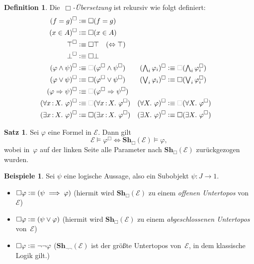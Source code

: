 \documentclass{article}
\theoremstyle{definition}
\newtheorem*{defn}{Definition}
\newtheorem*{satz}{Satz}
\newtheorem*{bspe}{Beispiele}
\theoremstyle{remark}
\newcommand{\defequiv}{\vcentcolon\equiv}
\newcommand{\?}{\,{:}\,}
\renewcommand{\_}{\mathpunct{.}\,}
\newcommand{\Sh}{\mathbf{Sh}} %
\newcommand{\Eat}{\mathcal{E}} %
\begin{document}
\begin{defn}
Die~\emph{$\Box$-Übersetzung} ist rekursiv wie folgt definiert:
\newcommand{\optBox}{\textcolor{lightgray}{\Box}}
\begin{align*}
  (f = g)^\Box &\defequiv \Box(f = g) \\
  (x \in A)^\Box &\defequiv \Box(x \in A) \\
  \top^\Box &\defequiv \Box\top \quad \text{($\Leftrightarrow \top$)} \\
  \bot^\Box &\defequiv \Box\bot \\
  (\varphi \wedge \psi)^\Box &\defequiv \optBox(\varphi^\Box \wedge \psi^\Box) &
  \textstyle (\bigwedge_i \varphi_i)^\Box &\defequiv \textstyle \optBox(\bigwedge_i \varphi_i^\Box) \\
  (\varphi \vee \psi)^\Box &\defequiv \Box(\varphi^\Box \vee \psi^\Box) &
  \textstyle (\bigvee_i \varphi_i)^\Box &\defequiv \textstyle \Box(\bigvee_i \varphi_i^\Box) \\
  (\varphi \Rightarrow \psi)^\Box &\defequiv \optBox(\varphi^\Box \Rightarrow \psi^\Box) \\
  (\forall x\?X\_ \varphi)^\Box &\defequiv \optBox(\forall x\?X\_ \varphi^\Box) &
  (\forall X\_ \varphi)^\Box &\defequiv \optBox(\forall X\_ \varphi^\Box) \\
  (\exists x\?X\_ \varphi)^\Box &\defequiv \Box(\exists x\?X\_ \varphi^\Box) &
  (\exists X\_ \varphi)^\Box &\defequiv \Box(\exists X\_ \varphi^\Box)
\end{align*}
\end{defn}

\begin{satz}
  Sei $\varphi$ eine Formel in $\Eat$.
  Dann gilt
  \[
    \Eat \models \varphi^\Box \iff
    \Sh_\Box(\Eat) \models \varphi,
  \]
  wobei in~$\varphi$ auf der linken Seite alle Parameter nach $\Sh_\Box(\Eat)$ zurückgezogen wurden.
\end{satz}

\begin{bspe}
  Sei $\psi$ eine logische Aussage, also ein Subobjekt $\psi : J \to 1$.
  \begin{itemize}
    \item
      $\Box \varphi \defequiv (\psi \implies \varphi)$ \quad
      (hiermit wird $\Sh_\Box(\Eat)$ zu einem \emph{offenen Untertopos} von~$\Eat$)
    \item
      $\Box \varphi \defequiv (\psi \vee \varphi)$ \quad
      (hiermit wird $\Sh_\Box(\Eat)$ zu einem \emph{abgeschlossenen Untertopos} von~$\Eat$)
    \item
      $\Box \varphi \defequiv \neg \neg \varphi$ \quad
      ($\Sh_{\neg \neg}(\Eat)$ ist der größte Untertopos von~$\Eat$, in dem klassische Logik gilt.)
  \end{itemize}
\end{bspe}
\end{document}

